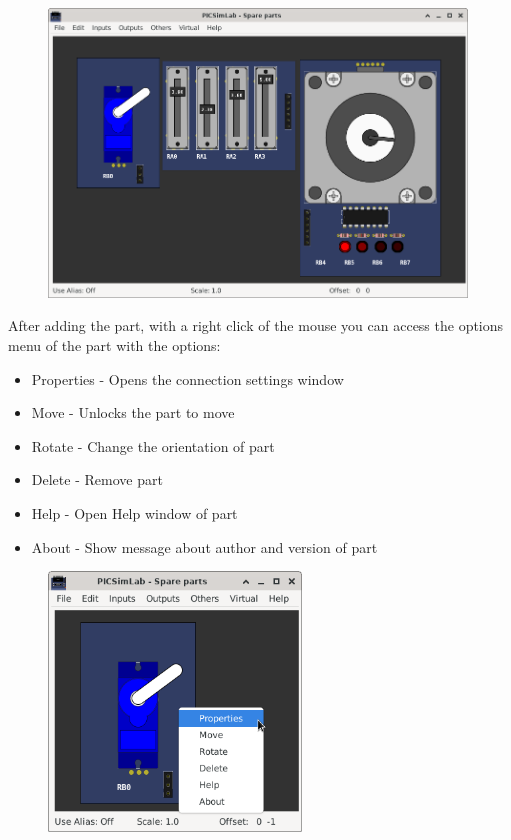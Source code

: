 \begin{figure}[H]
\center
\includegraphics[width=0.99\textwidth]{img/spare.png} 
\end{figure} 

After adding the part, with a right click of the mouse you can access the options menu of the part with the options:
\begin{itemize}
 \item Properties - Opens the connection settings window
 \item Move - Unlocks the part to move
 \item Rotate - Change the orientation of part
 \item Delete - Remove part
 \item Help - Open Help window of part
 \item About - Show message about author and version of part
\end{itemize}


\begin{figure}[H]
\center
\includegraphics[width=0.60\textwidth]{img/spare_pmenu.png} 
\end{figure} 

